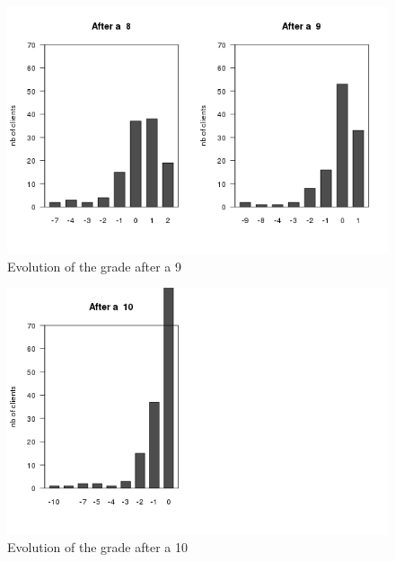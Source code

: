 \documentclass[a4paper, 11pt]{article}
\begin{document}
        \begin{figure}[!ht]
                \centering
                \includegraphics[height = 10 cm]{Remi/Evolution_of_the_grade_after_a_9.png}
                \caption{Evolution of the grade after a 9}
                \label{fig:e_9}
        \end{figure}

        \begin{figure}[!ht]
                \centering
                \includegraphics[height = 10 cm]{Remi/Evolution_of_the_grade_after_a_10.png}
                \caption{Evolution of the grade after a 10}
                \label{fig:e_10}
        \end{figure}
\end{document}
